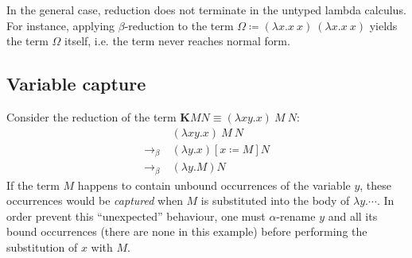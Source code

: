In the general case, reduction does not terminate in the untyped lambda calculus.
For instance, applying $\beta$-reduction to the term
$\Omega \coloneqq (\lambda x. x\ x)\ (\lambda x. x\ x)$
yields the term $\Omega$ itself, i.e. the term never reaches normal form.

\subsection{Variable capture}
Consider the reduction of the term $\mathbf{K}MN \equiv (\lambda x y. x)\ M\ N$:
\begin{align*}
  & (\lambda x y. x)\ M\ N \\
  \to_\beta\ & (\lambda y. x)[x \coloneqq M] N \\
  \to_\beta\ & (\lambda y. M) N
\end{align*}
%
If the term $M$ happens to contain unbound occurrences of the variable $y$, these
occurrences would be \emph{captured} when $M$ is substituted into the body of
$\lambda y. \cdots$.
In order prevent this ``unexpected'' behaviour, one must $\alpha$-rename $y$ and all its
bound occurrences (there are none in this example) before performing the substitution
of $x$ with $M$.
